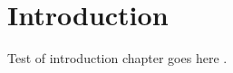 \chapter{Introduction}
\label{chap:introduction}

Test of introduction chapter goes here \cite{bibtex_key}.